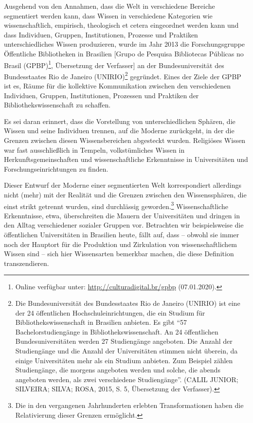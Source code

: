 \documentclass[a4paper,
fontsize=11pt,
oneside,
numbers=noperiodatend,
parskip=half-,
bibliography=totoc,
final
]{scrartcl}
\begin{document}
Ausgehend von den Annahmen, dass die Welt in verschiedene Bereiche
segmentiert werden kann, dass Wissen in verschiedene Kategorien wie
wissenschaftlich, empirisch, theologisch et cetera eingeordnet werden
kann und dass Individuen, Gruppen, Institutionen, Prozesse und Praktiken
unterschiedliches Wissen produzieren, wurde im Jahr 2013 die
Forschungsgruppe Öffentliche Bibliotheken in Brasilien {[}Grupo de
Pesquisa Bibliotecas Públicas no Brasil (GPBP)\footnote{Online verfügbar
  unter: \url{http://culturadigital.br/gpbp} (07.01.2020).}, Übersetzung
der Verfasser{]} an der Bundesuniversität des Bundesstaates Rio de
Janeiro (UNIRIO)\footnote{Die Bundesuniversität des Bundesstaates Rio de
  Janeiro (UNIRIO) ist eine der 24 öffentlichen Hochschuleinrichtungen,
  die ein Studium für Bibliothekswissenschaft in Brasilien anbieten. Es
  gibt \enquote{57 Bachelorstudiengänge in Bibliothekswissenschaft. An
  24 öffentlichen Bundesuniversitäten werden 27 Studiengänge angeboten.
  Die Anzahl der Studiengänge und die Anzahl der Universitäten stimmen
  nicht überein, da einige Universitäten mehr als ein Studium anbieten.
  Zum Beispiel zählen Studiengänge, die morgens angeboten werden und
  solche, die abends angeboten werden, als zwei verschiedene
  Studiengänge}. (CALIL JUNIOR; SILVEIRA; SILVA; ROSA, 2015, S. 5,
  Übersetzung der Verfasser).} gegründet. Eines der Ziele der GPBP ist
es, Räume für die kollektive Kommunikation zwischen den verschiedenen
Individuen, Gruppen, Institutionen, Prozessen und Praktiken der
Bibliothekswissenschaft zu schaffen.

Es sei daran erinnert, dass die Vorstellung von unterschiedlichen
Sphären, die Wissen und seine Individuen trennen, auf die Moderne
zurückgeht, in der die Grenzen zwischen diesen Wissensbereichen
abgesteckt wurden. Religiöses Wissen war fast ausschließlich in Tempeln,
volkstümliches Wissen in Herkunftsgemeinschaften und wissenschaftliche
Erkenntnisse in Universitäten und Forschungseinrichtungen zu finden.

Dieser Entwurf der Moderne einer segmentierten Welt korrespondiert
allerdings nicht (mehr) mit der Realität und die Grenzen zwischen den
Wissenssphären, die einst strikt getrennt wurden, sind durchlässig
geworden.\footnote{Die in den vergangenen Jahrhunderten erlebten
  Transformationen haben die Relativierung dieser Grenzen ermöglicht.}
Wissenschaftliche Erkenntnisse, etwa, überschreiten die Mauern der
Universitäten und dringen in den Alltag verschiedener sozialer Gruppen
vor. Betrachten wir beispielsweise die öffentlichen Universitäten in
Brasilien heute, fällt auf, dass -- obwohl sie immer noch der Hauptort
für die Produktion und Zirkulation von wissenschaftlichem Wissen sind --
sich hier Wissensarten bemerkbar machen, die diese Definition
transzendieren.
\end{document}
